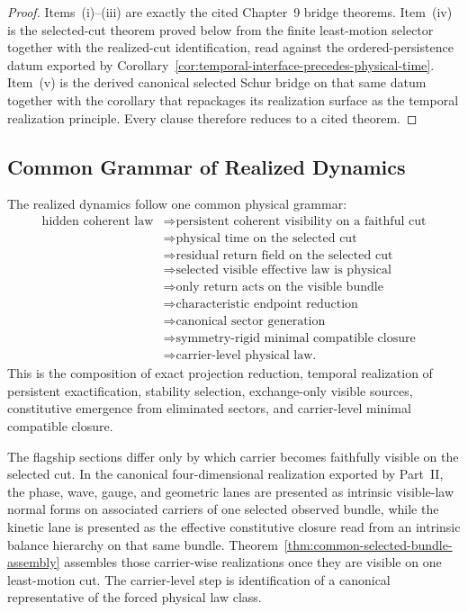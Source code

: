 \begin{proof}
Items~(i)--(iii) are exactly the cited Chapter~9 bridge theorems. Item~(iv)
is the selected-cut theorem proved below from the finite least-motion
selector together with the realized-cut identification, read against the
ordered-persistence datum exported by
Corollary~\ref{cor:temporal-interface-precedes-physical-time}. Item~(v) is the derived canonical
selected Schur bridge on that same datum together with the corollary that
repackages its realization surface as the temporal realization principle.
Every clause therefore reduces to a cited theorem.
\end{proof}

\subsection{Common Grammar of Realized Dynamics}

\begin{remark}
\label{rem:common-part-iv-grammar}
The realized dynamics follow one common physical grammar:
\[
\begin{aligned}
\text{hidden coherent law}
&\Longrightarrow \text{persistent coherent visibility on a faithful cut}\\
&\Longrightarrow \text{physical time on the selected cut}\\
&\Longrightarrow \text{residual return field on the selected cut}\\
&\Longrightarrow \text{selected visible effective law is physical}\\
&\Longrightarrow \text{only return acts on the visible bundle}\\
&\Longrightarrow \text{characteristic endpoint reduction}\\
&\Longrightarrow \text{canonical sector generation}\\
&\Longrightarrow \text{symmetry-rigid minimal compatible closure}\\
&\Longrightarrow \text{carrier-level physical law.}
\end{aligned}
\]
This is the composition of exact projection reduction, temporal realization of
persistent exactification, stability selection, exchange-only visible sources,
constitutive emergence from eliminated sectors, and carrier-level minimal
compatible closure.

The flagship sections differ only by which carrier becomes faithfully visible
on the selected cut. In the canonical four-dimensional realization exported by
Part~II, the phase, wave, gauge, and geometric lanes are presented as
intrinsic visible-law normal forms on associated carriers of one selected
observed bundle, while the kinetic lane is presented as the effective
constitutive closure read from an intrinsic balance hierarchy on that same
bundle. Theorem~\ref{thm:common-selected-bundle-assembly} assembles those
carrier-wise realizations once they are visible on one least-motion cut. The
carrier-level step is identification of a canonical representative of the
forced physical law class.
\end{remark}

